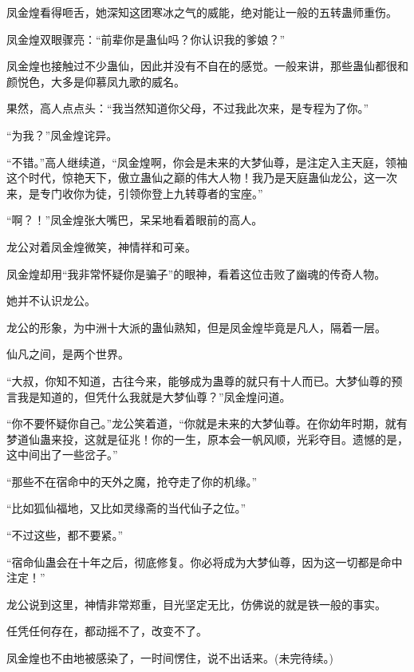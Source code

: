 \begin{this_body}
凤金煌看得咂舌，她深知这团寒冰之气的威能，绝对能让一般的五转蛊师重伤。

凤金煌双眼骤亮：“前辈你是蛊仙吗？你认识我的爹娘？”

凤金煌也接触过不少蛊仙，因此并没有不自在的感觉。一般来讲，那些蛊仙都很和颜悦色，大多是仰慕凤九歌的威名。

果然，高人点点头：“我当然知道你父母，不过我此次来，是专程为了你。”

“为我？”凤金煌诧异。

“不错。”高人继续道，“凤金煌啊，你会是未来的大梦仙尊，是注定入主天庭，领袖这个时代，惊艳天下，傲立蛊仙之巅的伟大人物！我乃是天庭蛊仙龙公，这一次来，是专门收你为徒，引领你登上九转尊者的宝座。”

“啊？！”凤金煌张大嘴巴，呆呆地看着眼前的高人。

龙公对着凤金煌微笑，神情祥和可亲。

凤金煌却用“我非常怀疑你是骗子”的眼神，看着这位击败了幽魂的传奇人物。

她并不认识龙公。

龙公的形象，为中洲十大派的蛊仙熟知，但是凤金煌毕竟是凡人，隔着一层。

仙凡之间，是两个世界。

“大叔，你知不知道，古往今来，能够成为蛊尊的就只有十人而已。大梦仙尊的预言我是知道的，但凭什么我就是大梦仙尊？”凤金煌问道。

“你不要怀疑你自己。”龙公笑着道，“你就是未来的大梦仙尊。在你幼年时期，就有梦道仙蛊来投，这就是征兆！你的一生，原本会一帆风顺，光彩夺目。遗憾的是，这中间出了一些岔子。”

“那些不在宿命中的天外之魔，抢夺走了你的机缘。”

“比如狐仙福地，又比如灵缘斋的当代仙子之位。”

“不过这些，都不要紧。”

“宿命仙蛊会在十年之后，彻底修复。你必将成为大梦仙尊，因为这一切都是命中注定！”

龙公说到这里，神情非常郑重，目光坚定无比，仿佛说的就是铁一般的事实。

任凭任何存在，都动摇不了，改变不了。

凤金煌也不由地被感染了，一时间愣住，说不出话来。(未完待续。)

\end{this_body}

